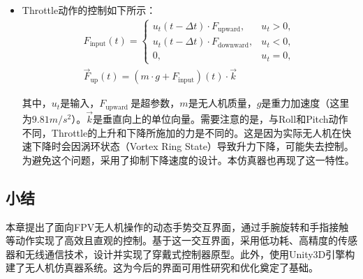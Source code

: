\begin{itemize}
    \item Throttle动作的控制如下所示：
          \begin{equation}
              \begin{aligned}
                  F_{\text{input}}(t) =
                  \begin{cases}
                      u_t(t-\Delta t) \cdot F_{\text{upward}},   & u_t > 0, \\
                      u_t(t-\Delta t) \cdot F_{\text{downward}}, & u_t < 0, \\
                      0,                                         & u_t = 0,
                  \end{cases} \\
                  \Vec{F}_{\text{up}}(t) = (m \cdot g + F_{\text{input}})(t) \cdot \Vec{k}
              \end{aligned}
          \end{equation}

          其中，$u_t$是输入，$F_{\text {upward }}$是超参数，$m$是无人机质量，$g$是重力加速度（这里为$9.81 m/s^2$）。$\Vec{k}$是垂直向上的单位向量。需要注意的是，与Roll和Pitch动作不同，Throttle的上升和下降所施加的力是不同的。这是因为实际无人机在快速下降时会因涡环状态（Vortex Ring State）导致升力下降，可能失去控制。为避免这个问题，采用了抑制下降速度的设计。本仿真器也再现了这一特性。

\end{itemize}

\subsection{小结}
本章提出了面向FPV无人机操作的动态手势交互界面，通过手腕旋转和手指接触等动作实现了高效且直观的控制。基于这一交互界面，采用低功耗、高精度的传感器和无线通信技术，设计并实现了穿戴式控制器原型。此外，使用Unity3D引擎构建了无人机仿真器系统。这为今后的界面可用性研究和优化奠定了基础。
\clearpage
\ifx\allfiles\undefined

\fi
